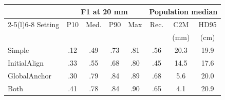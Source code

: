 \begin{tabular}{@{}lccccccc@{}}
\toprule
 & \multicolumn{4}{c}{F1 at 20 mm} & \multicolumn{3}{c}{Population median} \\
\cmidrule(lr){2-5}\cmidrule(l){6-8}
Setting & P10 & Med. & P90 & Max & Rec. & C2M & HD95 \\
 & & & & & & (mm) & (cm) \\
\midrule
Simple & .12 & .49 & .73 & .81 & .56 & 20.3 & 19.9 \\
InitialAlign & .33 & .55 & .68 & .80 & .45 & 14.5 & 17.6 \\
GlobalAnchor & .30 & .79 & .84 & .89 & .68 & 5.6 & 20.0 \\
Both & .41 & .78 & .84 & .90 & .65 & 4.1 & 20.9 \\
\bottomrule
\end{tabular}
